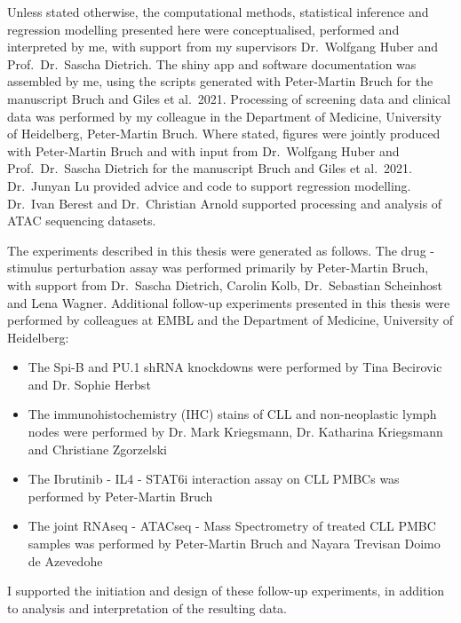 \documentclass[11pt, a4paper, twosided]{book}
\begin{document}
    Unless stated otherwise, the computational methods, statistical inference and regression modelling presented here were conceptualised, performed and interpreted by me, with support from my supervisors Dr.~Wolfgang Huber and Prof.~Dr.~Sascha Dietrich. The shiny app and software documentation was assembled by me, using the scripts generated with Peter-Martin Bruch for the manuscript Bruch and Giles et al.~2021. Processing of screening data and clinical data was performed by my colleague in the Department of Medicine, University of Heidelberg, Peter-Martin Bruch. Where stated, figures were jointly produced with Peter-Martin Bruch and with input from Dr.~Wolfgang Huber and Prof.~Dr.~Sascha Dietrich for the manuscript Bruch and Giles et al.~2021. Dr.~Junyan Lu provided advice and code to support regression modelling. Dr.~Ivan Berest and Dr.~Christian Arnold supported processing and analysis of ATAC sequencing datasets.

    The experiments described in this thesis were generated as follows. The drug - stimulus perturbation assay was performed primarily by Peter-Martin Bruch, with support from Dr.~Sascha Dietrich, Carolin Kolb, Dr.~Sebastian Scheinhost and Lena Wagner. Additional follow-up experiments presented in this thesis were performed by colleagues at EMBL and the Department of Medicine, University of Heidelberg:
    \begin{itemize}
        \item  The Spi-B and PU.1 shRNA knockdowns were performed by Tina Becirovic and Dr. Sophie Herbst
        \item  The immunohistochemistry (IHC) stains of CLL and non-neoplastic lymph nodes were performed by Dr. Mark Kriegsmann, Dr. Katharina Kriegsmann and Christiane Zgorzelski
        \item  The Ibrutinib - IL4 - STAT6i interaction assay on CLL PMBCs was performed by Peter-Martin Bruch
        \item  The joint RNAseq - ATACseq - Mass Spectrometry of treated CLL PMBC samples was performed by Peter-Martin Bruch and Nayara Trevisan Doimo de Azevedohe
        
    \end{itemize}
    I supported the initiation and design of these follow-up experiments, in addition to analysis and interpretation of the resulting data.
\newpage\null\newpage
\end{document}
